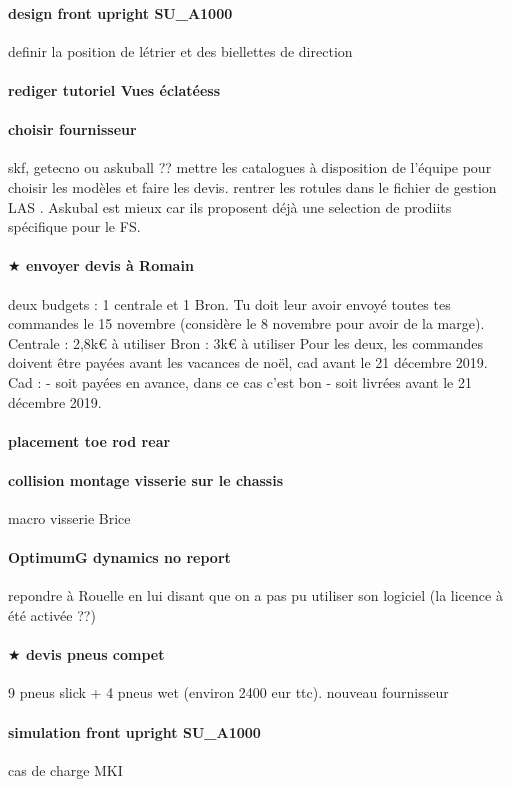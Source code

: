 \paragraph{design front upright SU\_A1000} definir la position de létrier et des biellettes de direction 
\paragraph{rediger tutoriel Vues éclatéess} 
\paragraph{choisir fournisseur} skf, getecno ou askuball ?? mettre les catalogues à disposition de l'équipe pour choisir les modèles et faire les devis. rentrer les rotules dans le fichier de gestion LAS . Askubal est mieux car ils proposent déjà une selection de prodiits spécifique pour le FS. 
\paragraph{$\bigstar$ envoyer devis à Romain} deux budgets : 1 centrale et 1 Bron. Tu doit leur avoir envoyé toutes tes commandes le 15 novembre (considère le 8 novembre pour avoir de la marge).
Centrale : 2,8k€ à utiliser
Bron : 3k€ à utiliser
Pour les deux, les commandes doivent être payées avant les vacances de noël, cad avant le 21 décembre 2019.
Cad :
- soit payées en avance, dans ce cas c'est bon
- soit livrées avant le 21 décembre 2019.
\paragraph{placement toe rod rear} 
\paragraph{collision montage visserie sur le chassis} macro visserie Brice
\paragraph{OptimumG dynamics no report} repondre à Rouelle en lui disant que on a pas pu utiliser son logiciel (la licence à été activée ??)
\paragraph{$\bigstar$ devis pneus compet} 9 pneus slick + 4 pneus wet (environ 2400 eur ttc). nouveau fournisseur
\paragraph{simulation front upright SU\_A1000} cas de charge MKI
